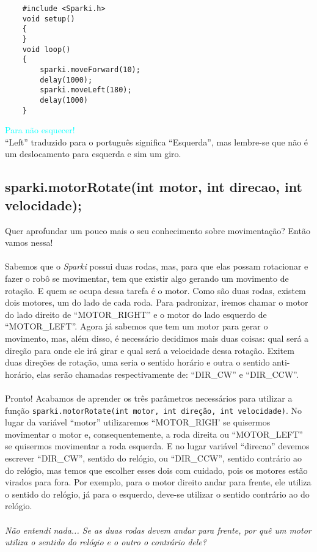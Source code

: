     \begin{verbatim}
    #include <Sparki.h>
    void setup()
    {
    }
    void loop()
    {
        sparki.moveForward(10);
        delay(1000);
        sparki.moveLeft(180);
        delay(1000)
    }
    \end{verbatim}
    \begin{center}
    
   \textcolor{cyan}{Para não esquecer!}
   \\``Left'' traduzido para o português significa ``Esquerda'', mas lembre-se que não é um deslocamento para esquerda e sim um giro.
    \end{center}
    
\subsection{sparki.motorRotate(int motor, int direcao,  int velocidade);}

Quer aprofundar um pouco mais o seu conhecimento sobre movimentação? Então vamos nessa!
\paragraph{}
Sabemos que o \textsl{Sparki} possui duas rodas, mas, para que elas possam rotacionar e fazer o robô se movimentar, tem que existir algo gerando um movimento de rotação. E quem se ocupa dessa tarefa é o motor. Como são duas rodas, existem dois motores, um do lado de cada roda. Para padronizar, iremos chamar o motor do lado direito de ``MOTOR\_RIGHT'' e o motor do lado esquerdo de ``MOTOR\_LEFT''. Agora já sabemos que tem um motor para gerar o movimento, mas, além disso, é necessário decidimos mais duas coisas: qual será a direção para onde ele irá girar e qual será a velocidade dessa rotação. Exitem duas direções de rotação, uma seria o sentido horário e outra o sentido anti-horário, elas serão chamadas respectivamente de: ``DIR\_CW'' e ``DIR\_CCW''.
\paragraph{}
Pronto! Acabamos de aprender os três parâmetros necessários para utilizar a função \texttt{sparki.motorRotate(int motor, int direção, int velocidade)}. No lugar da variável ``motor'' utilizaremos ``MOTOR\_RIGH' se quisermos movimentar o motor e, consequentemente, a roda direita ou ``MOTOR\_LEFT'' se quisermos movimentar a roda esquerda. E no lugar variável ``direcao'' devemos escrever ``DIR\_CW'', sentido do relógio, ou ``DIR\_CCW'', sentido contrário ao do relógio, mas temos que escolher esses dois com cuidado, pois os motores estão virados para fora. Por exemplo, para o motor direito andar para frente, ele utiliza o sentido do relógio, já para o esquerdo, deve-se utilizar o sentido contrário ao do relógio.
\\~\\
\textit{Não entendi nada... Se as duas rodas devem andar para frente, por quê um motor utiliza o sentido do relógio e o outro o contrário dele?}

